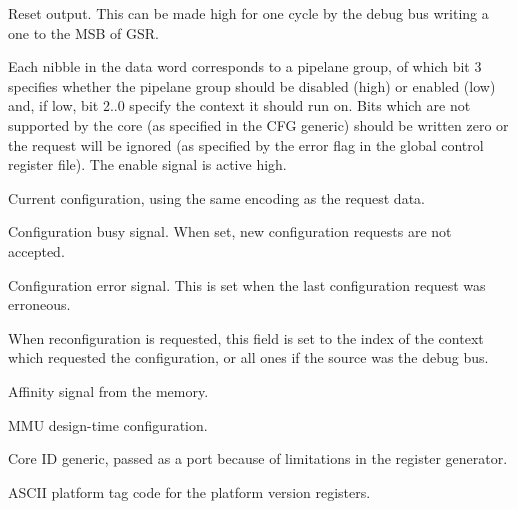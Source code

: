 
\globalInterface{}

\ifaceSubGroup{}
Reset output. This can be made high for one cycle by the debug bus writing a one
to the MSB of GSR.

\ifaceSubGroup{}
Each nibble in the data word corresponds to a pipelane group, of which bit 3 
specifies whether the pipelane group should be disabled (high) or enabled (low) 
and, if low, bit 2..0 specify the context it should run on. Bits which are not 
supported by the core (as specified in the CFG generic) should be written zero 
or the request will be ignored (as specified by the error flag in the global 
control register file). The enable signal is active high.

\ifaceSubGroup{}
Current configuration, using the same encoding as the request data.
    
\ifaceSubGroup{}
Configuration busy signal. When set, new configuration requests are not 
accepted.
    
\ifaceSubGroup{}
Configuration error signal. This is set when the last configuration request was 
erroneous.
    
\ifaceSubGroup{}
When reconfiguration is requested, this field is set to the index of the context 
which requested the configuration, or all ones if the source was the debug bus.

\ifaceSubGroup{}
Affinity signal from the memory.

\ifaceSubGroup{}
MMU design-time configuration.

\ifaceSubGroup{}
Core ID generic, passed as a port because of limitations in the register
generator.

\ifaceSubGroup{}
ASCII platform tag code for the platform version registers.

